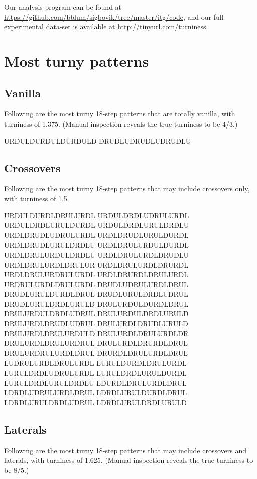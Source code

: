 \documentclass[10pt]{sigplanconf}
\begin{document}
Our analysis program can be found at \url{https://github.com/bblum/sigbovik/tree/master/itg/code}, and our full experimental data-set is available at \url{http://tinyurl.com/turniness}.

\section{Most turny patterns}


\subsection{Vanilla}

Following are the most turny 18-step patterns that are totally vanilla, with turniness of 1.375. (Manual inspection reveals the true turniness to be 4/3.)

\noindent
URDULDURDULDURDULD
DRUDLUDRUDLUDRUDLU

\subsection{Crossovers}

Following are the most turny 18-step patterns that may include crossovers only, with turniness of 1.5.

\noindent
URDULDURDLDRULURDL
URDULDRDLUDRULURDL
URDULDRDLURULDURDL
URDULDRDLURULDRDLU
URDLDRUDLUDRULURDL
URDLDRUDLURULDURDL
URDLDRUDLURULDRDLU
URDLDRULURDULDURDL
URDLDRULURDULDRDLU
URDLDRULURDLDRUDLU
URDLDRULURDLDRULUR
URDLDRULURDLDRURDL
URDLDRULURDRULURDL
URDLDRURDLDRULURDL
URDRULURDLDRULURDL
DRUDLUDRULURDLDRUL
DRUDLURULDURDLDRUL
DRUDLURULDRDLUDRUL
DRUDLURULDRDLURULD
DRULURDULDURDLDRUL
DRULURDULDRDLUDRUL
DRULURDULDRDLURULD
DRULURDLDRUDLUDRUL
DRULURDLDRUDLURULD
DRULURDLDRULURDULD
DRULURDLDRULURDLDR
DRULURDLDRULURDRUL
DRULURDLDRURDLDRUL
DRULURDRULURDLDRUL
DRURDLDRULURDLDRUL
LUDRULURDLDRULURDL
LURULDURDLDRULURDL
LURULDRDLUDRULURDL
LURULDRDLURULDURDL
LURULDRDLURULDRDLU
LDURDLDRULURDLDRUL
LDRDLUDRULURDLDRUL
LDRDLURULDURDLDRUL
LDRDLURULDRDLUDRUL
LDRDLURULDRDLURULD

\subsection{Laterals}

Following are the most turny 18-step patterns that may include crossovers and laterals, with turniness of 1.625. (Manual inspection reveals the true turniness to be 8/5.)
\end{document}

